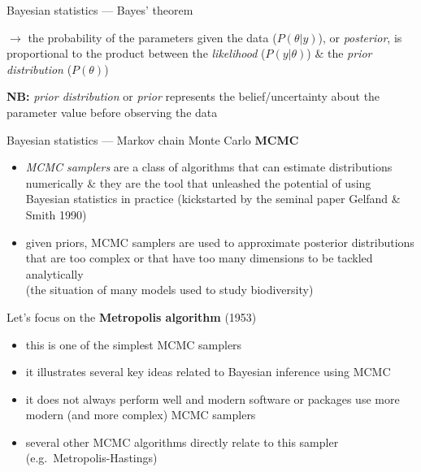 \documentclass[
  ignorenonframetext,
  aspectratio=169,
  t]{beamer}
\providecommand{\tightlist}{%
  \setlength{\itemsep}{0pt}\setlength{\parskip}{0pt}}
\newcommand{\bluenorm}[1]{\textcolor{bluebeamer}{#1}}
\newcommand{\blueit}[1]{\textcolor{bluebeamer}{\emph{#1}}}
\newcommand{\bluebold}[1]{\textcolor{bluebeamer}{\textbf{#1}}}
\begin{document}
\begin{frame}{Bayesian statistics --- Bayes' theorem}
\pause

\(\rightarrow\) the probability of the parameters given the data
(\(P(\theta|y)\)), or \blueit{posterior}, is proportional to the product
between the \blueit{likelihood} (\(P(y|\theta)\)) \& the
\blueit{prior distribution} (\(P(\theta)\))

\textbf{NB:} \blueit{prior distribution} or \blueit{prior} represents
the belief/uncertainty about the parameter value before observing the
data
\end{frame}

\begin{frame}{Bayesian statistics --- Markov chain Monte Carlo}
\protect{}\label{bayesian-statistics-markov-chain-monte-carlo}
\bluebold{MCMC}

\begin{itemize}
\tightlist
\item
  \blueit{MCMC samplers} are a class of algorithms that can estimate
  distributions numerically \& they are the tool that unleashed the
  potential of using Bayesian statistics in practice (kickstarted by the
  seminal paper Gelfand \& Smith 1990)
\item
  given priors, MCMC samplers are used to \bluenorm{approximate}
  posterior distributions that are too complex or that have too many
  dimensions to be tackled analytically\\
  (the situation of many models used to study biodiversity)
\end{itemize}

\pause

Let's focus on the \bluebold{Metropolis algorithm} \bluenorm{(1953)}

\begin{itemize}
\tightlist
\item
  this is one of the simplest MCMC samplers
\item
  it illustrates several key ideas related to Bayesian inference using
  MCMC
\item
  it does not always perform well and modern software or packages use
  more modern (and more complex) MCMC samplers
\item
  several other MCMC algorithms directly relate to this sampler
  (e.g.~Metropolis-Hastings)
\end{itemize}
\end{frame}
\end{document}
